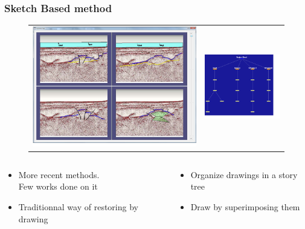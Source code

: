 \documentclass{beamer}
\begin{document}
	\begin{frame}
	\frametitle{Sketch Based method}
	 \begin{figure}[H]
	\centering
	\vspace*{-0.5cm}
	\begin{tabular}{@{}cc@{}}
	\includegraphics[width=.42\textwidth]{lidal0.png}&
	\includegraphics[width=.42\textwidth]{lidal1.png}\\
	\end{tabular}
	\label{lidal}
	\end{figure}
	\begin{columns}
	\begin{column}{0.60\textwidth}
	\vspace*{-0.5cm}
	\begin{itemize}
	\item More recent methods.\\ Few works done on it
	\item Traditionnal way of restoring by drawing
	\end{itemize}
	\end{column}
	\begin{column}{0.60\textwidth}
	\begin{itemize}
	\item Organize drawings in a story tree 
	\item Draw by superimposing them
	\end{itemize}
	\end{column}
	\end{columns}
	\end{frame} 
	
\end{document}
